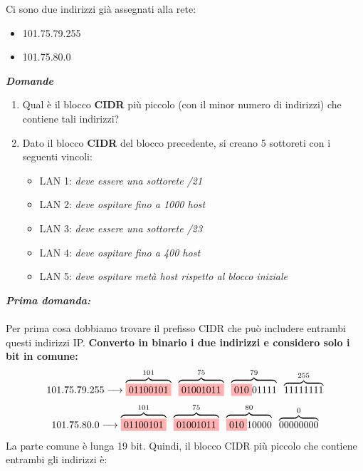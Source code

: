 \documentclass[12pt]{article}
\begin{document}
Ci sono due indirizzi già assegnati alla rete:

\begin{itemize}
    \item 101.75.79.255
    \item 101.75.80.0
\end{itemize}
\textbf{\textit{Domande}}
\begin{enumerate}
    \item Qual è il blocco \textbf{CIDR} più piccolo (con il minor numero di indirizzi) che contiene tali indirizzi?
    \item Dato il blocco \textbf{CIDR} del blocco precedente, si creano 5 sottoreti con i seguenti vincoli:
    \begin{itemize}
        \item LAN 1: \textit{deve essere una sottorete /21}
        \item LAN 2: \textit{deve ospitare fino a 1000 host}
        \item LAN 3: \textit{deve essere una sottorete /23}
        \item LAN 4: \textit{deve ospitare fino a 400 host}
        \item LAN 5: \textit{deve ospitare metà host rispetto al blocco iniziale}
        
    \end{itemize}
\end{enumerate}
\textbf{\textit{Prima domanda:}}
\\\\
Per prima cosa dobbiamo trovare il prefisso CIDR che può includere entrambi questi indirizzi IP. 
\textbf{Converto in binario i due indirizzi e considero solo i bit in comune: }
\[101.75.79.255 \longrightarrow \overbrace{\colorbox{red!30!white}{01100101}}^{101} \; \; \overbrace{\colorbox{red!30!white}{01001011}}^{75} \; \; \overbrace{\colorbox{red!30!white}{010}01111}^{79} \; \; \overbrace{1111 1111}^{255}\]
\[101.75.80.0 \longrightarrow \overbrace{\colorbox{red!30!white}{01100101}}^{101} \; \; \overbrace{\colorbox{red!30!white}{01001011}}^{75} \; \; \overbrace{\colorbox{red!30!white}{010}10000}^{80} \; \; \overbrace{00000000}^{0}\]
La parte comune è lunga 19 bit. Quindi, il blocco CIDR più piccolo che contiene entrambi gli indirizzi è:
\end{document}
